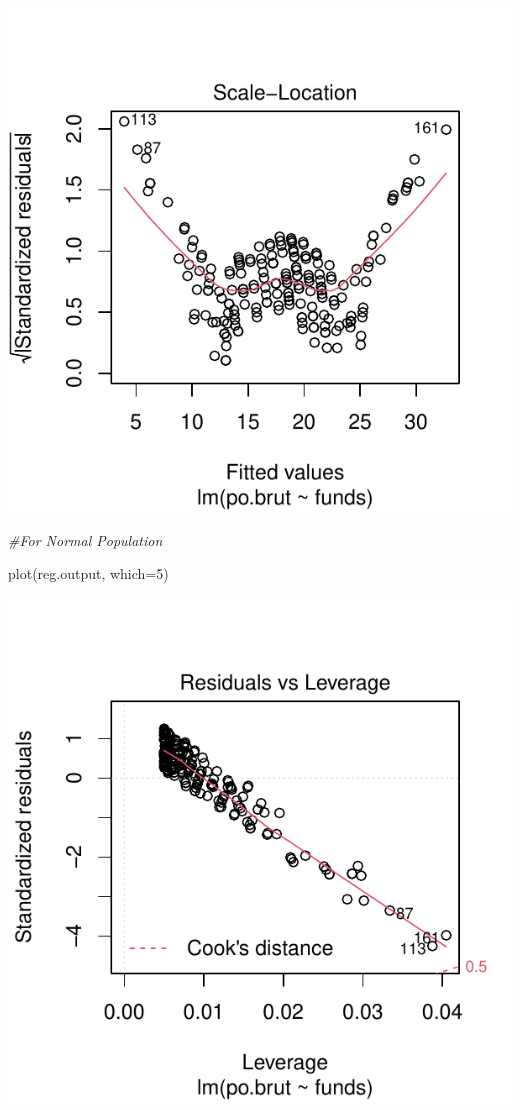 \documentclass[
]{article}
\newenvironment{Shaded}{\begin{snugshade}}{\end{snugshade}}
\newcommand{\AttributeTok}[1]{\textcolor[rgb]{0.77,0.63,0.00}{#1}}
\newcommand{\CommentTok}[1]{\textcolor[rgb]{0.56,0.35,0.01}{\textit{#1}}}
\newcommand{\DecValTok}[1]{\textcolor[rgb]{0.00,0.00,0.81}{#1}}
\newcommand{\FunctionTok}[1]{\textcolor[rgb]{0.00,0.00,0.00}{#1}}
\newcommand{\NormalTok}[1]{#1}
\begin{document}
\includegraphics{Assignments_files/figure-latex/unnamed-chunk-36-4.pdf}

\begin{Shaded}
\begin{Highlighting}[]
\CommentTok{\#For Normal Population}

\FunctionTok{plot}\NormalTok{(reg.output, }\AttributeTok{which=}\DecValTok{5}\NormalTok{)}
\end{Highlighting}
\end{Shaded}

\includegraphics{Assignments_files/figure-latex/unnamed-chunk-36-5.pdf}
\end{document}
